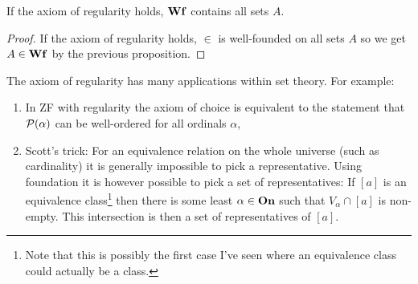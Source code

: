 \begin{corollary}
    If the axiom of regularity holds, \({\bf Wf}\) contains all sets \(A\).

    \begin{proof}
        If the axiom of regularity holds, \(\in\) is well-founded on all sets \(A\)
        so we get \(A\in{\bf Wf}\) by the previous proposition.
    \end{proof}
\end{corollary}

The axiom of regularity has many applications within set theory. For example:
\begin{enumerate}
    \item In ZF with regularity the axiom of choice is equivalent to the
          statement that \(\mathcal{P}(\alpha)\) can be well-ordered for all
          ordinals \(\alpha\),
    \item Scott's trick: For an equivalence relation on the whole universe (such
          as cardinality) it is generally impossible to pick a representative.
          Using foundation it is however possible to pick a set of
          representatives: If \([a]\) is an equivalence class\footnote{Note that
              this is possibly the first case I've seen where an equivalence class
              could actually be a class.} then there is some least
          \(\alpha\in{\bf On}\) such that \(V_{\alpha}\cap[a]\) is non-empty.
          This intersection is then a set of representatives of \([a]\).
\end{enumerate}